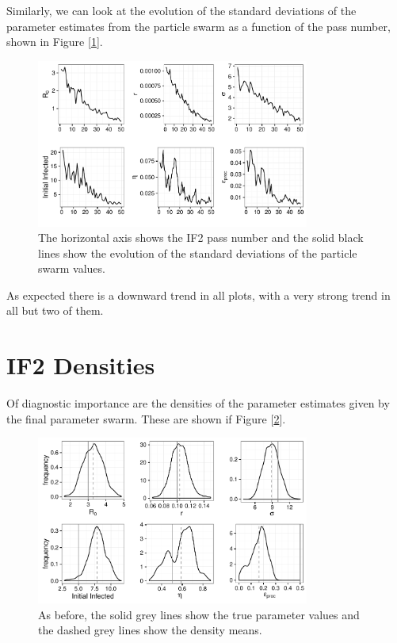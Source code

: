     Similarly, we can look at the evolution of the standard deviations of the parameter estimates from the particle swarm as a function of the pass number, shown in Figure [\ref{if2sdconvergence}].

    \begin{figure}
        \centering
        \captionsetup{width=.8\linewidth}
        \includegraphics[width=0.8\textwidth]{./images/if2sdconvergence.pdf}
        \caption{The horizontal axis shows the IF2 pass number and the solid black lines show the evolution of the standard deviations of the particle swarm values. \label{if2sdconvergence}}
    \end{figure}

    As expected there is a downward trend in all plots, with a very strong trend in all but two of them.


\section{IF2 Densities}

	Of diagnostic importance are the densities of the parameter estimates given by the final parameter swarm. These are shown if Figure [\ref{if2kernels}].

	\begin{figure}
        \centering
        \captionsetup{width=.8\linewidth}
        \includegraphics[width=0.8\textwidth]{./images/if2kernels.pdf}
        \caption{As before, the solid grey lines show the true parameter values and the dashed grey lines show the density means. \label{if2kernels}}
    \end{figure}

